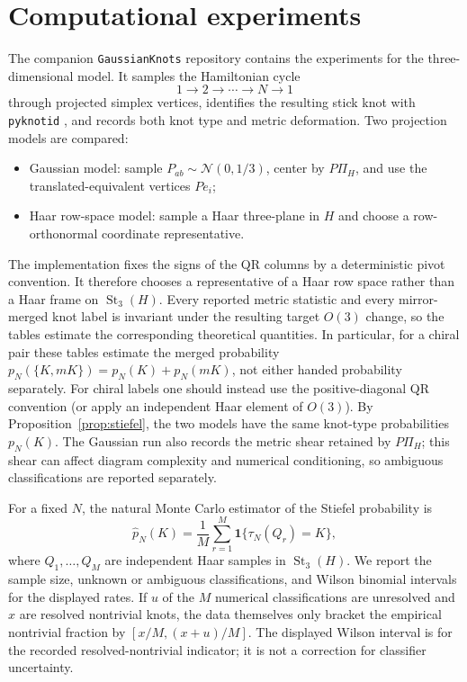 \documentclass[11pt]{amsart}
\theoremstyle{remark}
\newcommand{\1}{\mathbf{1}}
\newcommand{\St}{\operatorname{St}}
\begin{document}
\section{Computational experiments}

The companion \texttt{GaussianKnots} repository contains the experiments for the
three-dimensional model.  It samples the Hamiltonian cycle
\[
1\to2\to\cdots\to N\to1
\]
through projected simplex vertices, identifies the resulting stick knot with
\texttt{pyknotid} \cite{pyknotid}, and records both knot type and metric deformation.  Two
projection models
are compared:
\begin{itemize}
\item[1.] Gaussian model: sample \(P_{ab}\sim\mathcal N(0,1/3)\), center by
\(P\Pi_H\), and use the translated-equivalent vertices \(Pe_i\);
\item[2.] Haar row-space model: sample a Haar three-plane in \(H\) and choose
a row-orthonormal coordinate representative.
\end{itemize}
The implementation fixes the signs of the QR columns by a deterministic pivot
convention.  It therefore chooses a representative of a Haar row space rather
than a Haar frame on \(\St_3(H)\).  Every reported metric statistic and every
mirror-merged knot label is invariant under the resulting target \(O(3)\)
change, so the tables estimate the corresponding theoretical quantities.
In particular, for a chiral pair these tables estimate the merged probability
\(p_N(\{K,mK\})=p_N(K)+p_N(mK)\), not either handed probability separately.
For chiral labels one should instead use the positive-diagonal QR convention
(or apply an independent Haar element of \(O(3)\)).
By Proposition~\ref{prop:stiefel}, the two models have the same knot-type probabilities
\(p_N(K)\).  The Gaussian run also records the metric shear retained by \(P\Pi_H\);
this shear can affect diagram complexity and numerical conditioning, so ambiguous
classifications are reported separately.

For a fixed \(N\), the natural Monte Carlo estimator of the Stiefel probability is
\[
    \widehat p_N(K)
    =
    \frac{1}{M}\sum_{r=1}^M
    \mathbf 1\{\tau_N(Q_r)=K\},
\]
where \(Q_1,\dots,Q_M\) are independent Haar samples in \(\St_3(H)\).  We report the
sample size, unknown or ambiguous classifications, and Wilson binomial intervals for the
displayed rates.
If \(u\) of the \(M\) numerical classifications are unresolved and \(x\) are resolved
nontrivial knots, the data themselves only bracket the empirical nontrivial fraction by
\([x/M,(x+u)/M]\).  The displayed Wilson interval is for the recorded resolved-nontrivial
indicator; it is not a correction for classifier uncertainty.
\end{document}
